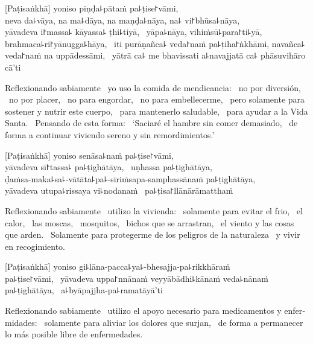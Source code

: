 [Paṭisaṅkhā] yoniso piṇḍa꜕pātaṁ pa꜕ṭise꜓vāmi, \pause\\
neva da꜕vāya, na ma꜕dāya, na maṇḍa꜕nāya, na꜕ vi꜓bhūsa꜕nāya, \pause\\
yāvadeva i꜓massa꜕ kāyassa꜕ ṭhi꜕tiyā, \pause\ yāpa꜕nāya, vihiṁsū꜕para꜓ti꜕yā, \pause\\
brahmaca꜕ri꜓yānugga꜕hāya, \pause\ iti purāṇañca꜕ veda꜓naṁ pa꜕ṭiha꜓ṅkhāmi,
navañca꜕ veda꜓naṁ na uppādessāmi, \pause\ yātrā ca꜕ me bhavissati a꜕navajjatā
ca꜕ phāsuvihāro cā'ti

\begin{english}
  Reflexionando sabiamente \pause\ yo uso la comida de mendicancia: \pause\ no por
  diversión, \pause\ no por placer, \pause\ no para engordar, \pause\ no para
  embellecerme, \pause\ pero solamente para sostener y nutrir este cuerpo, \pause\
  para mantenerlo saludable, \pause\ para ayudar a la Vida Santa. \pause\ Pensando
  de esta forma: \pause\ `Saciaré el hambre sin comer demasiado, \pause\ de
  forma a continuar viviendo sereno y sin remordimientos.'
\end{english}

\clearpage

[Paṭisaṅkhā] yoniso senāsa꜕naṁ pa꜕ṭise꜓vāmi, \pause\\
yāvadeva sī꜓tassa꜕ pa꜕ṭighātāya, \pause\ uṇhassa pa꜕ṭighātāya, \pause\\
ḍaṁsa-maka꜕sa꜕-vātāta꜕pa꜕-siriṁsapa-samphassānaṁ pa꜕ṭighātāya, \pause\\
yāvadeva utupa꜕rissaya vi꜕nodanaṁ \pause\ pa꜕ṭisa꜓llānārāmatthaṁ

\begin{english}
  Reflexionando sabiamente \pause\ utilizo la vivienda: \pause\ solamente para evitar el
  frio, \pause\ el calor, \pause\ las moscas, \pause\ mosquitos, \pause\ bichos
  que se arrastran, \pause\ el viento y las cosas que arden. \pause\ Solamente para
  protegerme de los peligros de la naturaleza \pause\ y vivir en recogimiento.
\end{english}

[Paṭisaṅkhā] yoniso gi꜕lāna-pacca꜕ya꜕-bhesajja-pa꜕rikkhāraṁ\\
pa꜕ṭise꜓vāmi, \pause\ yāvadeva uppa꜓nnānaṁ veyyābādhi꜕kānaṁ veda꜕nānaṁ
pa꜕ṭighātāya, \pause\ a꜕byāpajjha-pa꜕ramatāyā'ti

\begin{english}
  Reflexionando sabiamente \pause\ utilizo el apoyo necesario para medicamentos y
  enfermidades: \pause\ solamente para aliviar los dolores que surjan,
  \pause\ de forma a permanecer lo más posible libre de enfermedades.
\end{english}

